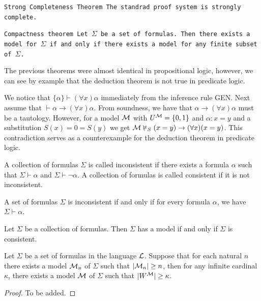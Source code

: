 \documentclass[11pt,a4paper]{article}
\DeclareRobustCommand{\nmodels}{%
  \mathrel{\text{\ooalign{$\vDash$\cr\hss\raisebox{0.2ex}{\scalebox{0.8}{$/$}}\hss}}}%
}
\renewcommand{\implies}{\rightarrow}
\begin{document}
\begin{theorem}\tt{Strong Completeness Theorem}
  The standrad proof system is strongly complete.
\end{theorem}

\begin{theorem}\tt{Compactness theorem}
  Let $\Sigma$ be a set of formulas.
  Then there exists a model for $\Sigma$ if and only if
  there exists a model for any finite subset of $\Sigma$.
\end{theorem}

The previous theorems were almost identical in propositional logic,
however, we can see by example that the deduction theorem is not
true in predicate logic.

\begin{example}
  We notice that $\{\alpha\} \vdash (\forall x) \alpha$ immediately
  from the inference rule GEN.
  Next assume that $\vdash \alpha \implies (\forall x) \alpha$.
  From soundness, we have that $\alpha \implies (\forall x) \alpha$
  must be a tautology.
  However, for a model $\mathcal{M}$ with $U^{\mathcal{M}} = \{0,1\}$ and 
  $\alpha \colon x = y$ and a substitution $S(x) = 0 = S(y)$ we get
  $\M \nmodels_S (x = y) \implies (\forall x)(x = y)$.
  This contradiction serves as a counterexample for the deduction theorem
  in predicate logic.
\end{example}

\begin{definition}
  A collection of formulas $\Sigma$ is called inconsistent if there 
  exists a formula $\alpha$ such that $\Sigma \vdash \alpha$ and
  $\Sigma \vdash \neg \alpha$.
  A collection of formulas is called consistent if it is not inconsistent.
\end{definition}

\begin{proposition}
  A set of formulas $\Sigma$ is inconsistent if and only if for every 
  formula $\alpha$, we have $\Sigma \vdash \alpha$.
\end{proposition}

\begin{proposition}
  Let $\Sigma$ be a collection of formulas.
  Then $\Sigma$ has a model if and only if $\Sigma$ is consistent.
\end{proposition}

\begin{theorem}\label{thm:finite-infinite}
  Let $\Sigma$ be a set of formulas in the language $\mathcal{L}$.
  Suppose that for each natural $n$ there exists a model $\mathcal{M}_n$ of 
  $\Sigma$ such that $|\mathcal{M}_n| \geq n$, 
  then for any infinite cardinal $\kappa$, there exists a model 
  $\mathcal{M}$ of $\Sigma$ such that $|W^{\mathcal{M}}| \geq \kappa$.
\end{theorem}
\begin{proof}
  To be added.
\end{proof}
\end{document}
